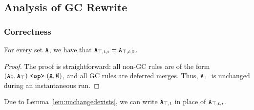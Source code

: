 \subsection{Analysis of GC Rewrite}

\subsubsection{Correctness}
\label{sec:logical:analysis:correctness}

\begin{lemma}
\label{lem:unchangedexists}
For every set $\tt{A}$, we have that $\tt{A}_{\top,t,i} = \tt{A}_{\top,t,0}$.
\end{lemma}
\begin{proof}
The proof is straightforward: all non-GC rules are of the form $(\tt{A}_\exists, \tt{A}_\top) ~\tt{<op>}~ (\tt{X}, \emptyset)$, and all GC rules are deferred merges.
Thus, $\tt{A}_\top$ is unchanged during an instantaneous run.
\end{proof}
Due to Lemma \ref{lem:unchangedexists}, we can write $\tt{A}_{\top,t}$ in place of $\tt{A}_{\top,t,i}$.

